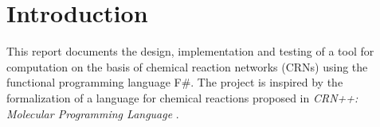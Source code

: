 \section{Introduction}
This report documents the design, implementation and testing of a tool for computation on the basis of chemical reaction networks (CRNs) using the functional programming language F\#. The project is inspired by the formalization of a language for chemical reactions proposed in \textit{CRN++: Molecular Programming Language} \cite{soloveichik2018a}. 